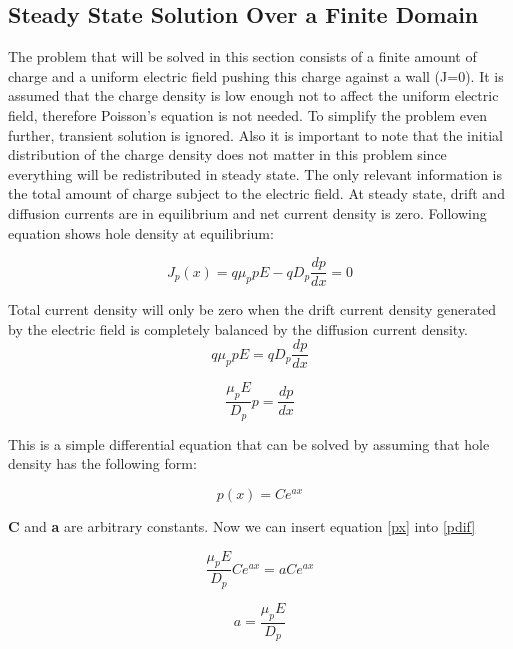 \subsection{Steady State Solution Over a Finite Domain}

The problem that will be solved in this section consists of a finite amount of charge and a uniform electric field pushing this charge against a wall (J=0). It is assumed that the charge density is low enough not to affect the uniform electric field, therefore Poisson's equation is not needed. To simplify the problem even further, transient solution is ignored. Also it is important to note that the initial distribution of the charge density does not matter in this problem since everything will be redistributed in steady state. The only relevant information is the total amount of charge subject to the electric field. At steady state, drift and diffusion currents are in equilibrium and net current density is zero. Following equation shows hole density at equilibrium:

\begin{equation}
J_p(x)=q \mu_{p} p E-qD_{p} \frac{dp}{dx} =0
\end{equation}

Total current density will only be zero when the drift current density generated by the electric field is completely balanced by the diffusion current density.
\begin{equation}
q \mu_{p} p E=qD_{p} \frac{dp}{dx}
\end{equation}

\begin{equation}
 \frac{\mu_{p} E}{D_{p}} p  = \frac{dp}{dx}
 \label{pdif}
\end{equation}

This is a simple differential equation that can be solved by assuming that hole density has the following form:

\begin{equation}
p(x)=Ce^{ax}
\label{px}
\end{equation}

\textbf{C} and \textbf{a} are arbitrary constants. Now we can insert equation \eqref{px} into \eqref{pdif}

\begin{equation}
 \frac{\mu_{p} E}{D_{p}} Ce^{ax}  = a Ce^{ax}
\end{equation}

\begin{equation}
a=\frac{\mu_{p} E}{D_{p}}
\end{equation}

